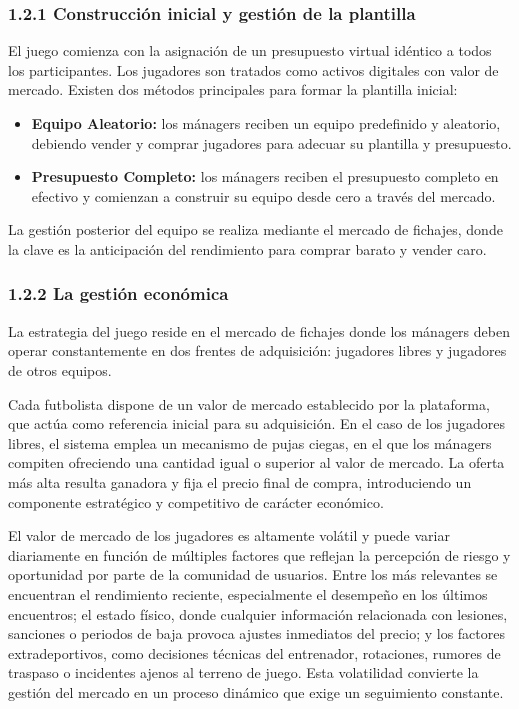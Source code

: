 \subsubsection{1.2.1 Construcción inicial y gestión de la plantilla}

El juego comienza con la asignación de un presupuesto virtual idéntico a todos los participantes.
Los jugadores son tratados como activos digitales con valor de mercado.
Existen dos métodos principales para formar la plantilla inicial:

\begin{itemize}
\item \textbf{Equipo Aleatorio:} los mánagers reciben un equipo predefinido y aleatorio, debiendo 
vender y comprar jugadores para adecuar su plantilla y presupuesto.
\item \textbf{Presupuesto Completo:} los mánagers reciben el presupuesto completo en efectivo y 
comienzan a construir su equipo desde cero a través del mercado.
\end{itemize}

La gestión posterior del equipo se realiza mediante el mercado de fichajes, donde la clave es la 
anticipación del rendimiento para comprar barato y vender caro.

\subsubsection{1.2.2 La gestión económica}

La estrategia del juego reside en el mercado de fichajes donde los mánagers deben operar constantemente 
en dos frentes de adquisición: jugadores libres y jugadores de otros equipos.

Cada futbolista dispone de un valor de mercado establecido por la plataforma, que actúa como referencia 
inicial para su adquisición.
En el caso de los jugadores libres, el sistema emplea un mecanismo de pujas ciegas, en el que los 
mánagers compiten ofreciendo una cantidad igual o superior al valor de mercado.
La oferta más alta resulta ganadora y fija el precio final de compra, introduciendo un componente 
estratégico y competitivo de carácter económico.

El valor de mercado de los jugadores es altamente volátil y puede variar diariamente en función de 
múltiples factores que reflejan la percepción de riesgo y oportunidad por parte de la comunidad de 
usuarios.
Entre los más relevantes se encuentran el rendimiento reciente, especialmente el desempeño en los 
últimos encuentros; el estado físico, donde cualquier información relacionada con lesiones, sanciones 
o periodos de baja provoca ajustes inmediatos del precio; y los factores extradeportivos, como 
decisiones técnicas del entrenador, rotaciones, rumores de traspaso o incidentes ajenos al terreno de 
juego.
Esta volatilidad convierte la gestión del mercado en un proceso dinámico que exige un seguimiento 
constante.

